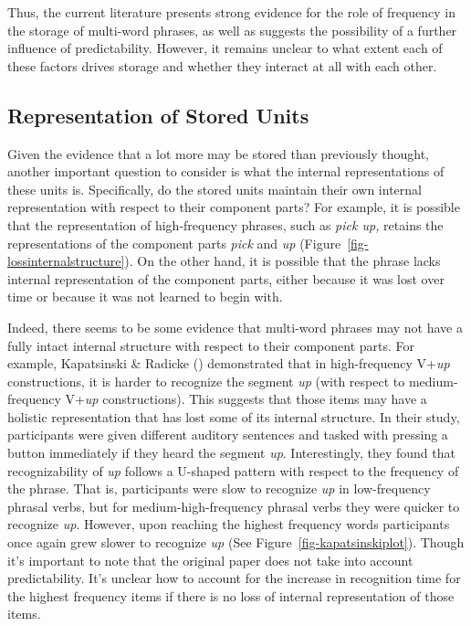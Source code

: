 \documentclass[
  12pt,
  letterpaper,
]{scrreport}
\begin{document}
Thus, the current literature presents strong evidence for the role of
frequency in the storage of multi-word phrases, as well as suggests the
possibility of a further influence of predictability. However, it
remains unclear to what extent each of these factors drives storage and
whether they interact at all with each other.

\subsection{Representation of Stored
Units}\label{representation-of-stored-units}

Given the evidence that a lot more may be stored than previously
thought, another important question to consider is what the internal
representations of these units is. Specifically, do the stored units
maintain their own internal representation with respect to their
component parts? For example, it is possible that the representation of
high-frequency phrases, such as \emph{pick up,} retains the
representations of the component parts \emph{pick} and \emph{up}
(Figure~\ref{fig-lossinternalstructure}). On the other hand, it is
possible that the phrase lacks internal representation of the component
parts, either because it was lost over time or because it was not
learned to begin with.

Indeed, there seems to be some evidence that multi-word phrases may not
have a fully intact internal structure with respect to their component
parts. For example, Kapatsinski \& Radicke
()
demonstrated that in high-frequency V+\emph{up} constructions, it is
harder to recognize the segment \emph{up} (with respect to
medium-frequency V+\emph{up} constructions). This suggests that those
items may have a holistic representation that has lost some of its
internal structure. In their study, participants were given different
auditory sentences and tasked with pressing a button immediately if they
heard the segment \emph{up}. Interestingly, they found that
recognizability of \emph{up} follows a U-shaped pattern with respect to
the frequency of the phrase. That is, participants were slow to
recognize \emph{up} in low-frequency phrasal verbs, but for
medium-high-frequency phrasal verbs they were quicker to recognize
\emph{up}. However, upon reaching the highest frequency words
participants once again grew slower to recognize \emph{up} (See
Figure~\ref{fig-kapatsinskiplot}). Though it's important to note that
the original paper does not take into account predictability. It's
unclear how to account for the increase in recognition time for the
highest frequency items if there is no loss of internal representation
of those items.
\end{document}
